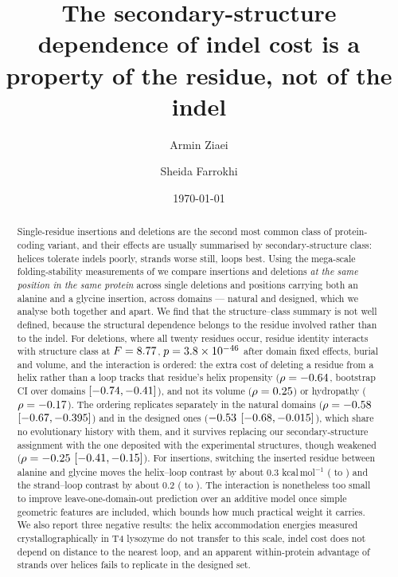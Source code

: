 \documentclass[11pt]{article}
\title{\bfseries The secondary-structure dependence of indel cost is a property of the
residue, not of the indel}
\author[1]{Armin Ziaei}
\author[2]{Sheida Farrokhi}
\affil[1]{Independent Researcher. Correspondence: \texttt{armin.ziaei.tech@gmail.com}}
\affil[2]{Independent Researcher. \texttt{sheyda.farrokhi.id@gmail.com}}
\date{\today}
\begin{document}
\maketitle

\begin{abstract}
\noindent
Single-residue insertions and deletions are the second most common class of protein-coding
variant, and their effects are usually summarised by secondary-structure class: helices tolerate
indels poorly, strands worse still, loops best. Using the mega-scale folding-stability
measurements of \citet{tsuboyama2023} we compare insertions and deletions \emph{at the same
position in the same protein} across \Nposdel{} single deletions and \Nposins{} positions carrying
both an alanine and a glycine insertion, across \Ndom{} domains --- \NNatDom{} natural and
\NDesDom{} designed, which we analyse both together and apart. We find that the
structure--class summary is not well defined, because the structural dependence belongs to the
residue involved rather than to the indel. For deletions, where all twenty residues occur,
residue identity interacts with structure class at $F = 8.77{}$, $p = 3.8\times10^{-46}{}$ after
domain fixed effects, burial and volume, and the interaction is ordered: the extra cost of
deleting a residue from a helix rather than a loop tracks that residue's helix propensity
($\rho = -0.64{}$, bootstrap CI over domains $[-0.74{}, -0.41{}]$), and not its
volume ($\rho = 0.25{}$) or hydropathy ($\rho = -0.17{}$). The ordering replicates separately
in the natural domains ($\rho = -0.58{}$ $[-0.67{}, -0.395{}]$) and in the designed ones
($-0.53{}$ $[-0.68{}, -0.015{}]$), which share no evolutionary history with them, and it
survives replacing our secondary-structure assignment with the one deposited with the
experimental structures, though weakened ($\rho = -0.25{}$ $[-0.41{}, -0.15{}]$). For insertions, switching the
inserted residue between alanine and glycine moves the helix--loop contrast by about
0.3 kcal\,mol$^{-1}$ (\AlaHL{} to \GlyHL{}) and the strand--loop contrast by about 0.2
(\AlaEL{} to \GlyEL{}). The interaction is nonetheless too small to improve
leave-one-domain-out prediction over an additive model once simple geometric features are
included, which bounds how much practical weight it carries. We also report three negative results: the
helix accommodation energies measured crystallographically in T4 lysozyme do not transfer to this
scale, indel cost does not depend on distance to the nearest loop, and an apparent within-protein
advantage of strands over helices fails to replicate in the designed set.
\end{abstract}
\end{document}

